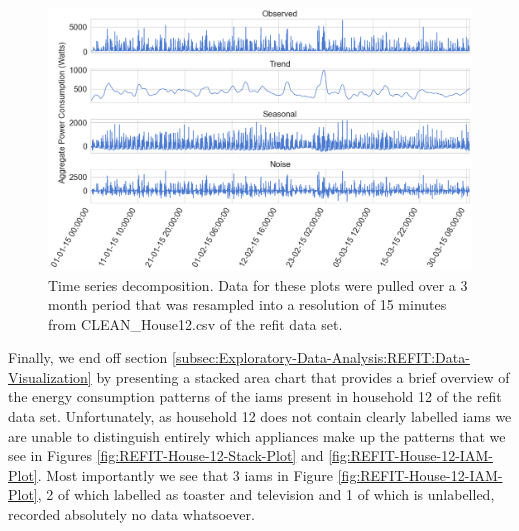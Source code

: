 \begin{figure}[H]
    \centering
    \includegraphics[width=\textwidth]{Images/Chapter 5/REFIT/REFIT-House-12-Time-Series-Decomposition.png}
    \caption{Time series decomposition. Data for these plots were pulled over a 3 month period that was resampled into a resolution of 15 minutes from CLEAN\_House12.csv of the \gls{refit} data set.}
    \label{fig:REFIT-House-12-Time-Series-Decomposition}
\end{figure}

\noindent \newline Finally, we end off section \ref{subsec:Exploratory-Data-Analysis:REFIT:Data-Visualization} by presenting a stacked area chart that provides a brief overview of the energy consumption patterns of the \glspl{iam} present in household 12 of the \gls{refit} data set. Unfortunately, as household 12 does not contain clearly labelled \glspl{iam} we are unable to distinguish entirely which appliances make up the patterns that we see in Figures \ref{fig:REFIT-House-12-Stack-Plot} and \ref{fig:REFIT-House-12-IAM-Plot}. Most importantly we see that 3 \glspl{iam} in Figure \ref{fig:REFIT-House-12-IAM-Plot}, 2 of which labelled as toaster and television and 1 of which is unlabelled, recorded absolutely no data whatsoever.

